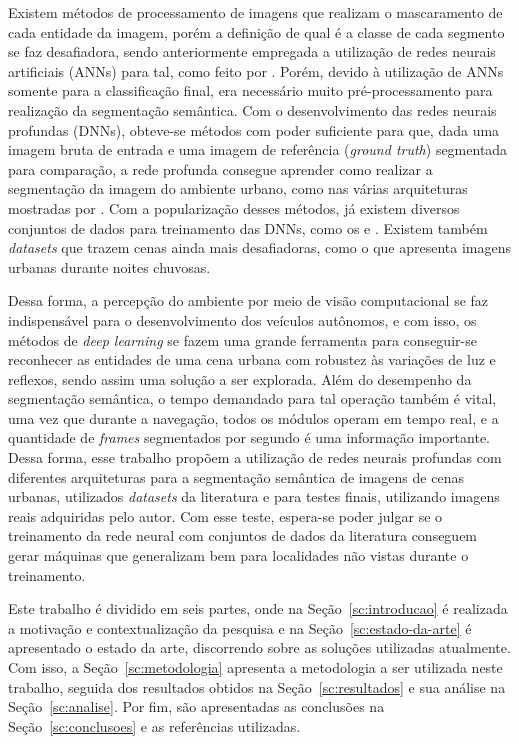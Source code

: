 \documentclass[conference]{IEEEtran}
\begin{document}
Existem métodos de processamento de imagens que realizam o mascaramento de cada entidade da imagem, porém a definição de qual é a classe de cada segmento se faz desafiadora, sendo anteriormente empregada a utilização de redes neurais artificiais (ANNs) para tal, como feito por \cite{vitor20132D3DVision}. Porém, devido à utilização de ANNs somente para a classificação final, era necessário muito pré-processamento para realização da segmentação semântica. Com o desenvolvimento das redes neurais profundas (DNNs), obteve-se métodos com poder suficiente para que, dada uma imagem bruta de entrada e uma imagem de referência (\textit{ground truth}) segmentada para comparação, a rede profunda consegue aprender como realizar a segmentação da imagem do ambiente urbano, como nas várias arquiteturas mostradas por \cite{papadeas2021RealTimeSemanticImage}. Com a popularização desses métodos, já existem diversos conjuntos de dados para treinamento das DNNs, como os \cite{cordts2016CityscapesDatasetSemantic} e \cite{brostow2008SegmentationRecognitionUsing,brostow2009SemanticObjectClasses}. Existem também \textit{datasets} que trazem cenas ainda mais desafiadoras, como o \cite{jin2021RaidaRRichAnnotated} que apresenta imagens urbanas durante noites chuvosas.

Dessa forma, a percepção do ambiente por meio de visão computacional se faz indispensável para o desenvolvimento dos veículos autônomos, e com isso, os métodos de \textit{deep learning} se fazem uma grande ferramenta para conseguir-se reconhecer as entidades de uma cena urbana com robustez às variações de luz e reflexos, sendo assim uma solução a ser explorada. Além do desempenho da segmentação semântica, o tempo demandado para tal operação também é vital, uma vez que durante a navegação, todos os módulos operam em tempo real, e a quantidade de \textit{frames} segmentados por segundo é uma informação importante. Dessa forma, esse trabalho propõem a utilização de redes neurais profundas com diferentes arquiteturas para a segmentação semântica de imagens de cenas urbanas, utilizados \textit{datasets} da literatura e para testes finais, utilizando imagens reais adquiridas pelo autor. Com esse teste, espera-se poder julgar se o treinamento da rede neural com conjuntos de dados da literatura conseguem gerar máquinas que generalizam bem para localidades não vistas durante o treinamento.

Este trabalho é dividido em seis partes, onde na Seção~\ref{sc:introducao} é realizada a motivação e contextualização da pesquisa e na Seção~\ref{sc:estado-da-arte} é apresentado o estado da arte, discorrendo sobre as soluções utilizadas atualmente. Com isso, a Seção~\ref{sc:metodologia} apresenta a metodologia a ser utilizada neste trabalho, seguida dos resultados obtidos na Seção~\ref{sc:resultados} e sua análise na Seção~\ref{sc:analise}. Por fim, são apresentadas as conclusões na Seção~\ref{sc:conclusoes} e as referências utilizadas.
\end{document}

